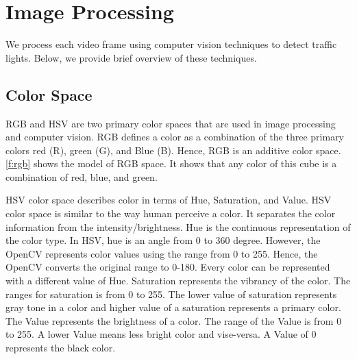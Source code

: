 \section {Image Processing}
We process each video frame using computer vision techniques to detect traffic lights. 
Below, we provide brief overview of these techniques. 

\subsection{Color Space}
RGB  and HSV  are two primary color spaces that are used in image processing and computer vision.
RGB defines a color as a combination of the three primary colors red (R), green (G), and Blue (B).
Hence, RGB is an additive color space.
\ref{f:rgb} shows the model of RGB space.
It shows that any color of this cube is a combination of red, blue, and green.

HSV color space describes color in terms of Hue, Saturation, and Value.
HSV color space is similar to the way human perceive a color.
It separates the color information from the intensity/brightness.
Hue is the continuous representation of the color type. 
In HSV, hue is an angle from 0 to 360 degree. 
However, the OpenCV  represents color values using the range from 0 to 255. 
Hence, the OpenCV converts the original range to 0-180.
Every color can be represented with a different value of Hue.
Saturation represents the vibrancy of the color.
The ranges for saturation is from 0 to 255.
The lower value of saturation represents gray tone in a color and higher value of a saturation represents a primary color.
The Value represents the brightness of a color.
The range of the Value is from 0 to 255.
A lower Value means less bright color and vise-versa.
A Value of 0 represents the black color.

